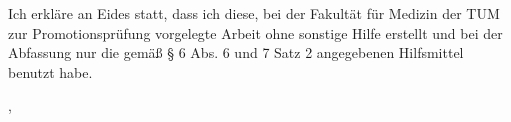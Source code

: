 \thispagestyle{empty}
\vspace*{0.8\textheight}
\noindent
Ich erkläre an Eides statt, dass ich diese, bei der Fakultät für Medizin der TUM zur Promotionsprüfung vorgelegte Arbeit ohne sonstige Hilfe erstellt und bei der Abfassung nur die gemäß § 6 Abs. 6 und 7 Satz 2 angegebenen Hilfsmittel benutzt habe.

\vspace{15mm}
\noindent
\getSubmissionLocation{}, \getSubmissionDate{} \hspace{5cm} \getAuthor{}

\cleardoublepage{}
